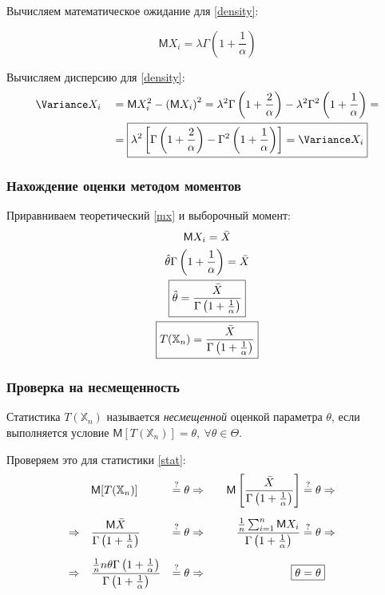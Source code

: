 \documentclass[12pt]{article}
\newcommand{\MExpect}{\mathsf{M}}
\begin{document}
\noindent Вычисляем математическое ожидание для \eqref{density}:

\begin{equation}\label{mx}
\boxed{\MExpect X_i = \lambda\Gamma \left(1+\frac{1}{\alpha} \right)}
\end{equation}

\noindent Вычисляем дисперсию для \eqref{density}:
\begin{equation}\label{dx}
\begin{aligned}
&\Variance X_i &&= \MExpect X_i^2 - \left(\MExpect X_i\right)^2 = \lambda^2\Gamma \left(1+\frac{2}{\alpha} \right) - \lambda^2\Gamma^2 \left(1+\frac{1}{\alpha} \right) = \\
&&&= \boxed{\lambda^2\left[\Gamma \left(1+\frac{2}{\alpha} \right) - \Gamma^2 \left(1+\frac{1}{\alpha} \right)\right] = \Variance X_i}
\end{aligned}
\end{equation}

\subsubsection{Нахождение оценки методом моментов}
\noindent Приравниваем теоретический \eqref{mx} и выборочный момент:
\begin{gather}
	\MExpect X_i = \bar{X} \notag\\
	\hat{\theta}\Gamma \left(1+\frac{1}{\alpha} \right) = \bar{X} \notag\\
	\boxed{\hat{\theta} = \frac{\bar{X}}{\Gamma \left(1+\frac{1}{\alpha} \right)} \label{eval}} \\
	\boxed{T(\mathbb{X}_n) = \frac{\bar{X}}{\Gamma \left(1+\frac{1}{\alpha} \right)}} \label{stat}
\end{gather}

\subsubsection{Проверка на несмещенность}
Статистика $T(\mathbb{X}_n)$ называется \textsl{несмещенной} оценкой параметра $\theta$, если выполняется условие $\MExpect [T(\mathbb{X}_n)] = \theta,\ \forall \theta \in \Theta$.

\noindent Проверяем это для статистики \eqref{stat}:
$$
\begin{aligned}
	&\MExpect [T(\mathbb{X}_n)] &\stackrel{?}{=} \theta \Rightarrow\quad && \MExpect \left[\frac{\bar{X}}{\Gamma \left(1+\frac{1}{\alpha} \right)}\right] &\stackrel{?}{=} \theta \Rightarrow\quad \\[1.3ex]
	\Rightarrow\quad &\frac{\MExpect \bar{X}}{\Gamma \left(1+\frac{1}{\alpha} \right)} &\stackrel{?}{=} \theta \Rightarrow\quad && \frac{\frac{1}{n}\sum_{i=1}^n \MExpect X_i}{\Gamma \left(1+\frac{1}{\alpha} \right)} &\stackrel{?}{=} \theta \Rightarrow\quad \\[1.3ex]
	\Rightarrow\quad &\frac{\frac{1}{n} n \theta \Gamma \left(1+\frac{1}{\alpha} \right)}{\Gamma \left(1+\frac{1}{\alpha} \right)} &\stackrel{?}{=} \theta \Rightarrow\quad && \Aboxed{\theta &= \theta}
\end{aligned}
$$
\end{document}
